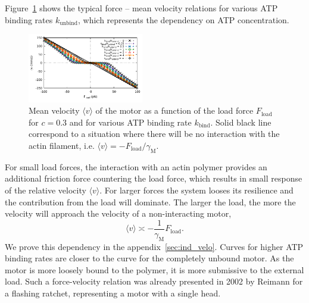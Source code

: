 \documentclass[aps,pre,twocolumn,showpacs,showkeys,superscriptaddress,floatfix]{revtex4-1}
\begin{document}
Figure~\ref{fig:F_v} shows the typical force -- mean velocity relations for various ATP binding rates $k_\text{unbind}$, which represents the dependency on ATP concentration.
\begin{figure}[t]
\centering
\includegraphics[width=0.45\textwidth,height=!]{F_v}
\caption{
\label{fig:F_v} 
Mean velocity $\langle v \rangle$ of the motor as a function of the load force $F_\text{load}$ for $c=0.3$ and for various ATP binding rate $k_\text{bind}$.
Solid black line correspond to a situation where there will be no interaction with the actin filament, i.e. $\langle v \rangle = - F_\text{load} / \gamma_\text{M}$. 
}
\end{figure}
For small load forces, the interaction with an actin polymer provides an additional friction force countering the load force, 
which results in small response of the relative velocity $\langle v \rangle$.
For larger forces the system looses its resilience and the contribution from the load will dominate. 
The larger the load, the more the velocity will approach the velocity of a non-interacting motor, 
\[
\langle v \rangle \asymp - \frac{1}{\gamma_\text{M}} F_\text{load}.
\]
We prove this dependency in the appendix~\ref{sec:ind_velo}. 
Curves for higher ATP binding rates are closer to the curve for the completely unbound motor.
As the motor is more loosely bound to the polymer, it is more submissive to the external load.
Such a force-velocity relation was already presented in 2002 by Reimann \cite{reimann2002brownian} for a flashing ratchet, representing a motor with a single head.
\end{document}
